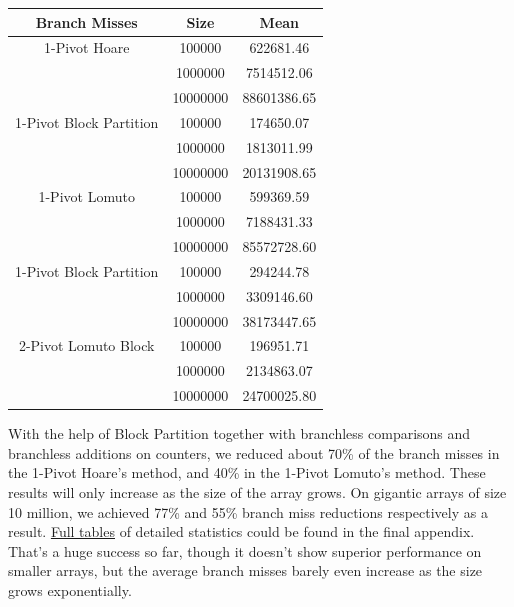 \documentclass[a4paper,oneside,12pt]{book}
\begin{document}
\begin{center}
\small
\begin{tabular}{ |c c | c | }
    \hline
    Branch Misses   & Size     & Mean         \\
    \hline
    1-Pivot Hoare   & 100000   & 622681.46    \\
                    & 1000000  & 7514512.06   \\
                    & 10000000 & 88601386.65  \\
    \hline
1-Pivot Block Partition & 100000   & 174650.07    \\
                    & 1000000  & 1813011.99   \\
                    & 10000000 & 20131908.65  \\
    \hline
    1-Pivot Lomuto  & 100000   & 599369.59    \\
                    & 1000000  & 7188431.33   \\
                    & 10000000 & 85572728.60  \\
    \hline
1-Pivot Block Partition & 100000   & 294244.78    \\
                    & 1000000  & 3309146.60   \\
                    & 10000000 & 38173447.65  \\
    \hline
2-Pivot Lomuto Block& 100000   & 196951.71    \\
                    & 1000000  & 2134863.07   \\
                    & 10000000 & 24700025.80  \\
    \hline
\end{tabular}
\end{center}

With the help of Block Partition together with branchless comparisons and branchless additions on counters, we reduced about 70\% of the branch misses in the 1-Pivot Hoare's method, and 40\% in the 1-Pivot Lomuto's method. These results will only increase as the size of the array grows.
On gigantic arrays of size 10 million, we achieved 77\% and 55\% branch miss reductions respectively as a result. \hyperlink{FullTables}{Full tables} of detailed statistics could be found in the final appendix. That's a huge success so far, though it doesn't show superior performance on smaller arrays, but the average branch misses barely even increase as the size grows exponentially.
\end{document}
